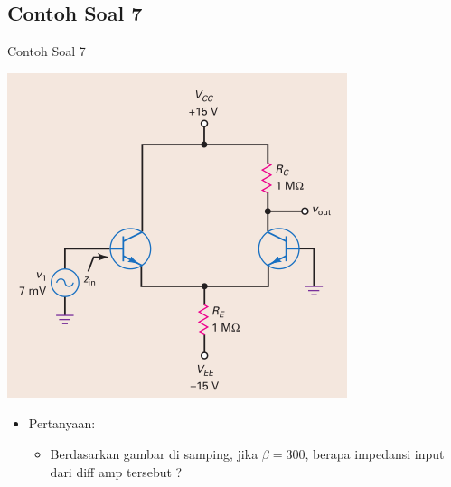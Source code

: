 \documentclass[aspectratio=169]{beamer}
\begin{document}
\subsection{Contoh Soal 7}
\begin{frame}{Contoh Soal 7}
	\begin{multicols}{2}
		\begin{center}
			\includegraphics[height=0.7\textheight]{gambar/01.contoh_soal_07}
		\end{center}
		\columnbreak
		\begin{itemize}
			\item Pertanyaan:
			\begin{itemize}
				\item Berdasarkan gambar di samping, jika $ \beta = 300 $, berapa impedansi input dari diff amp tersebut ?
			\end{itemize}
		\end{itemize}
	\end{multicols}
\end{frame}
\end{document}
